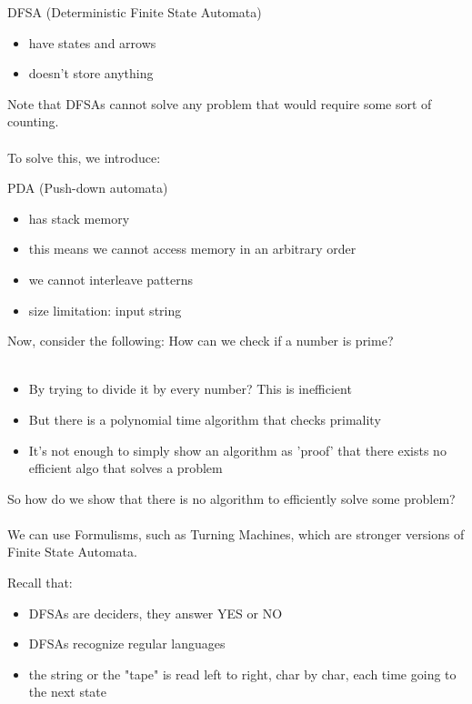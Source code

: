 \documentclass[12pt]{article}
\begin{document}
\begin{tcolorbox}
 DFSA (Deterministic Finite State Automata)
 \begin{itemize}
     \item have states and arrows
     \item doesn't store anything
 \end{itemize}
\end{tcolorbox}

Note that DFSAs cannot solve any problem that would require some sort of counting.
\\
\\
To solve this, we introduce:

\begin{tcolorbox}
 PDA (Push-down automata)
 \begin{itemize}
     \item has stack memory
     \item this means we cannot access memory in an arbitrary order
     \item we cannot interleave patterns
     \item size limitation: input string
 \end{itemize}
\end{tcolorbox}

Now, consider the following: How can we check if a number is prime?
\\
\\
\begin{itemize}
    \item By trying to divide it by every number? This is inefficient
    \item But there is a polynomial time algorithm that checks primality
    \item It's not enough to simply show an algorithm as 'proof' that there exists no efficient algo that solves a problem
\end{itemize}

So how do we show that there is no algorithm to efficiently solve some problem?
\\
\\
We can use Formulisms, such as Turning Machines, which are stronger versions of Finite State Automata.

Recall that:
\begin{itemize}
    \item DFSAs are deciders, they answer YES or NO
    \item DFSAs recognize regular languages
    \item the string or the "tape" is read left to right, char by char, each time going to the next state
\end{itemize}
\end{document}
